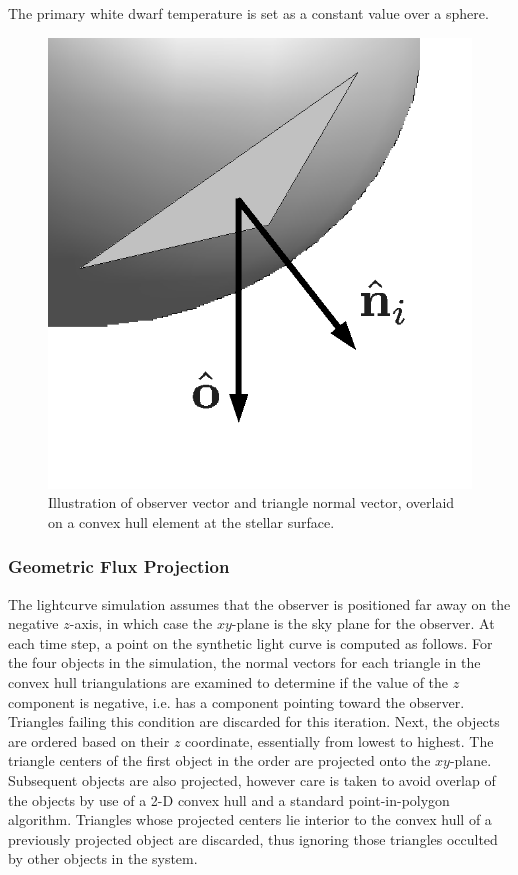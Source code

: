\documentclass[preprint2]{aastex}
\begin{document}
The primary white dwarf temperature is set as a constant value over a
sphere.

\begin{figure}[t]
   \centering
   \includegraphics[scale=0.6]{./figs/vectors.eps}
   \caption{Illustration of observer vector and triangle normal 
   vector, overlaid on a convex hull element at the stellar surface.}
   \label{vecfig}
\end{figure}

\subsubsection{Geometric Flux Projection}
\label{sec:geomFlux}
The lightcurve simulation assumes that the observer is positioned far away on the
negative $z$-axis, in which case the $xy$-plane is the sky plane for the observer.  At each time step, a point on the synthetic light
curve is computed as follows.  For the four objects in the simulation,
the normal vectors for each triangle in the convex hull triangulations
are examined to determine if the value of the $z$ component is
negative, i.e. has a component pointing toward the observer.
Triangles failing this condition are discarded for this iteration.
Next, the objects are ordered based on their $z$ coordinate,
essentially from lowest to highest.  The triangle centers of the first
object in the order are projected onto the $xy$-plane.  Subsequent
objects are also projected, however care is taken to avoid overlap of
the objects by use of a 2-D convex hull and a standard
point-in-polygon algorithm.  Triangles whose projected centers lie
interior to the convex hull of a previously projected object are
discarded, thus ignoring those triangles occulted by other objects in
the system.
\end{document}
